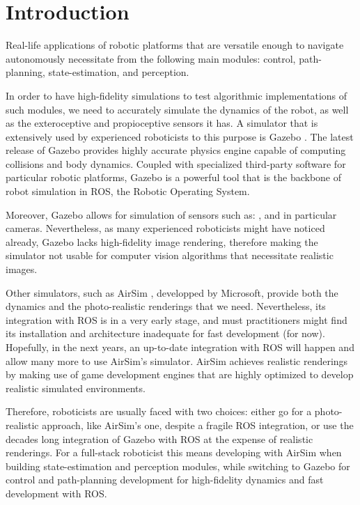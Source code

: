 
\section{Introduction}
\label{sec:introduction}

Real-life applications of robotic platforms that are versatile enough to navigate autonomously necessitate from the following main modules:
control, path-planning, state-estimation, and perception.

In order to have high-fidelity simulations to test algorithmic implementations of such modules, we need to accurately simulate the dynamics of the robot, as well as the exteroceptive and propioceptive sensors it has.
A simulator that is extensively used by experienced roboticists to this purpose is Gazebo .
The latest release of Gazebo provides highly accurate physics engine capable of computing collisions and body dynamics.
Coupled with specialized third-party software for particular robotic platforms, Gazebo is a powerful tool that is the backbone of robot simulation in ROS, the Robotic Operating System.

Moreover, Gazebo allows for simulation of sensors such as: , and in particular cameras.
Nevertheless, as many experienced roboticists might have noticed already, Gazebo lacks high-fidelity image rendering, therefore making the simulator not usable for computer vision algorithms that necessitate realistic images.

Other simulators, such as AirSim , developped by Microsoft, provide both the dynamics and the photo-realistic renderings that we need.
Nevertheless, its integration with ROS is in a very early stage, and must practitioners might find its installation and architecture inadequate for fast development (for now).
Hopefully, in the next years, an up-to-date integration with ROS will happen and allow many more to use AirSim's simulator.
AirSim achieves realistic renderings by making use of game development engines that are highly optimized to develop realistic simulated environments.

Therefore, roboticists are usually faced with two choices: either go for a photo-realistic approach, like AirSim's one, despite a fragile ROS integration, or use the decades long integration of Gazebo with ROS
at the expense of realistic renderings.
For a full-stack roboticist this means developing with AirSim when building state-estimation and perception modules, while switching to Gazebo for control and path-planning development for high-fidelity dynamics and fast development with ROS.

